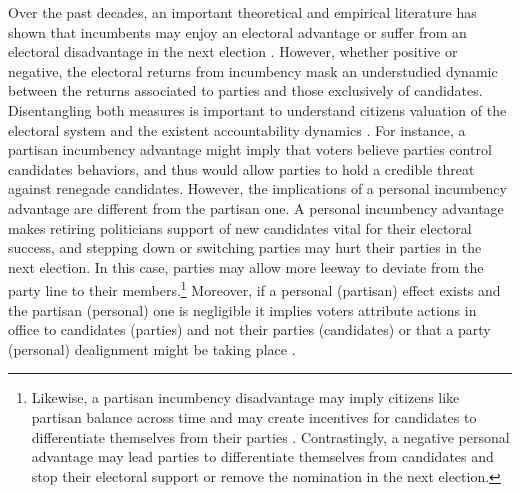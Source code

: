 \documentclass[12pt]{amsart}
\numberwithin{equation}{section}
\theoremstyle{definition}
\theoremstyle{definition}
\theoremstyle{definition}
\begin{document}
Over the past decades, an important theoretical and empirical literature has shown that incumbents may enjoy an electoral advantage \citep{ashworth_2012, cox_morgensten_1993, cox_katz_1996, ansolabehere_snyder_2000, ashworth_bdm_2008, ashworth_etal_2019} or suffer from an electoral disadvantage in the next election \citep{klasnja_2015, klasnja_titiunik_2017}. However, whether positive or negative, the electoral returns from incumbency mask an understudied dynamic between the returns associated to parties and those exclusively of candidates. Disentangling both measures is important to understand citizens valuation of the electoral system and the existent accountability dynamics \citep{mayhew_1974, fowler_hall_2014}. For instance, a partisan incumbency advantage might imply that voters believe parties control candidates behaviors, and thus would allow parties to hold a credible threat against renegade candidates. %
However, the implications of a personal incumbency advantage are different from the partisan one. A personal incumbency advantage makes retiring politicians support of new candidates vital for their electoral success, and stepping down or switching parties may hurt their parties in the next election. In this case, parties may allow more leeway to deviate from the party line to their members.\footnote{Likewise, a partisan incumbency disadvantage may imply citizens like partisan balance across time and may create incentives for candidates to differentiate themselves from their parties \citep{klasnja_titiunik_2017}. Contrastingly, a negative personal advantage may lead parties to differentiate themselves from candidates and stop their electoral support or remove the nomination in the next election.} Moreover, if a personal (partisan) effect exists and the partisan (personal) one is negligible it implies voters attribute actions in office to candidates (parties) and not their parties (candidates) or that a party (personal) dealignment might be taking place \citep{cox_katz_1996}.   
   
\end{document}
